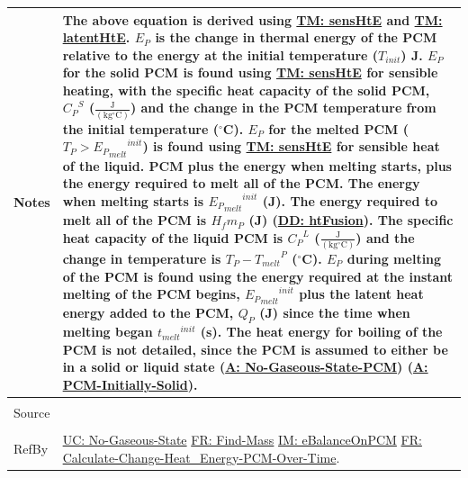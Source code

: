 \documentclass[12pt]{article}
\begin{document}
\begin{minipage}{\textwidth}
\begin{tabular}{p{} p{}}
Notes & The above equation is derived using \hyperref[TM:sensHtE]{TM: sensHtE} and \hyperref[TM:latentHtE]{TM: latentHtE}. ${E_{P}}$ is the change in thermal energy of the PCM relative to the energy at the initial temperature (${T_{init}}$) J. ${E_{P}}$ for the solid PCM is found using \hyperref[TM:sensHtE]{TM: sensHtE} for sensible heating, with the specific heat capacity of the solid PCM, ${{C_{P}}^{S}}$ ($\frac{\text{J}}{(\text{kg}{}^{\circ}\text{C})}$) and the change in the PCM temperature from the initial temperature (${}^{\circ}$C). ${E_{P}}$ for the melted PCM (${T_{P}}>{{{E_{P}}_{melt}}^{init}}$) is found using \hyperref[TM:sensHtE]{TM: sensHtE} for sensible heat of the liquid. PCM plus the energy when melting starts, plus the energy required to melt all of the PCM. The energy when melting starts is ${{{E_{P}}_{melt}}^{init}}$ (J). The energy required to melt all of the PCM is ${H_{f}} {m_{P}}$ (J) (\hyperref[DD:htFusion]{DD: htFusion}). The specific heat capacity of the liquid PCM is ${{C_{P}}^{L}}$ ($\frac{\text{J}}{(\text{kg}{}^{\circ}\text{C})}$) and the change in temperature is ${T_{P}}-{{T_{melt}}^{P}}$ (${}^{\circ}$C). ${E_{P}}$ during melting of the PCM is found using the energy required at the instant melting of the PCM begins, ${{{E_{P}}_{melt}}^{init}}$ plus the latent heat energy added to the PCM, ${Q_{P}}$ (J) since the time when melting began ${{t_{melt}}^{init}}$ (s). The heat energy for boiling of the PCM is not detailed, since the PCM is assumed to either be in a solid or liquid state (\hyperref[assumpNGSP]{A: No-Gaseous-State-PCM}) (\hyperref[assumpPIS]{A: PCM-Initially-Solid}).
\\ \midrule \\
Source & \cite{koothoor2013}
\\ \midrule \\
RefBy & \hyperref[unlikeChgNGS]{UC: No-Gaseous-State} \hyperref[findMass]{FR: Find-Mass} \hyperref[IM:eBalanceOnPCM]{IM: eBalanceOnPCM} \hyperref[calcChgHeatEnergyPCMOverTime]{FR: Calculate-Change-Heat\_Energy-PCM-Over-Time}.
\\ \bottomrule \end{tabular}
\end{minipage}
\end{document}
